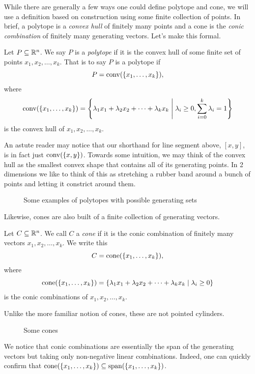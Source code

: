 \documentclass[12pt,oneside]{../../sfsuthesis}
\begin{document}
\begin{figure}[H]
    \centering
\end{figure}

While there are generally a few ways one could define polytope and cone, we will use a definition based on construction using some finite collection of points.
In brief, a polytope is a \emph{convex hull} of finitely many points and a cone is the \emph{conic combination} of finitely many generating vectors.
Let's make this formal.
\begin{definition}[Polytope]\label{def:polytope}
    Let \( P \subseteq \mathbb{R}^n \).
    We say \( P \) is a \emph{polytope} if it is the convex hull of some finite set of points \( x_1, x_2, \dots, x_k \).
    That is to say \( P \) is a polytope if
    \[
        P = \operatorname{conv}(\{x_1, \dots, x_k\}),
    \]
    where
    \[
        \operatorname{conv}(\{x_1, \dots, x_k\}) = \left\{ \lambda_1 x_1 + \lambda_2 x_2 + \cdots + \lambda_k x_k \; \middle| \; \lambda_i \geq 0, \sum_{i=0}^k \lambda_i = 1 \right\}
    \]
    is the convex hull of \( x_1, x_2, \dots, x_k \).
\end{definition}
An astute reader may notice that our shorthand for line segment above, \( [x, y] \), is in fact just \( \operatorname{conv}(\{x,y\}) \).
Towards some intuition, we may think of the convex hull as the smallest convex shape that contains all of its generating points.
In 2 dimensions we like to think of this as stretching a rubber band around a bunch of points and letting it constrict around them.
\begin{figure}[H]
    \centering
    \caption{Some examples of polytopes with possible generating sets}
\end{figure}

Likewise, cones are also built of a finite collection of generating vectors.
\begin{definition}[Cone]\th\label{def:cone}
    Let \( C \subseteq \mathbb{R}^n \).
    We call \( C \) a \emph{cone} if it is the conic combination of finitely many vectors \( x_1, x_2, \dots, x_k \).
    We write this
    \[
        C = \mathrm{cone}(\{x_1, \dots, x_k\}),
    \]
    where
    \[
        \mathrm{cone}(\{x_1, \dots, x_k\}) = \left\{ \lambda_1 x_1 + \lambda_2 x_2 + \cdots + \lambda_k x_k \; \middle| \; \lambda_i \geq 0 \right\}
    \]
    is the conic combinations of \( x_1, x_2, \dots, x_k \).

\end{definition}
Unlike the more familiar notion of cones, these are not pointed cylinders.
\begin{figure}[H]
    \centering
    \caption{Some cones}
\end{figure}
We notice that conic combinations are essentially the span of the generating vectors but taking only non-negative linear combinations.
Indeed, one can quickly confirm that \( \mathrm{cone}(\{x_1, \dots, x_k\}) \subseteq \operatorname{span}(\{x_1, \dots, x_k\}) \).
\end{document}
